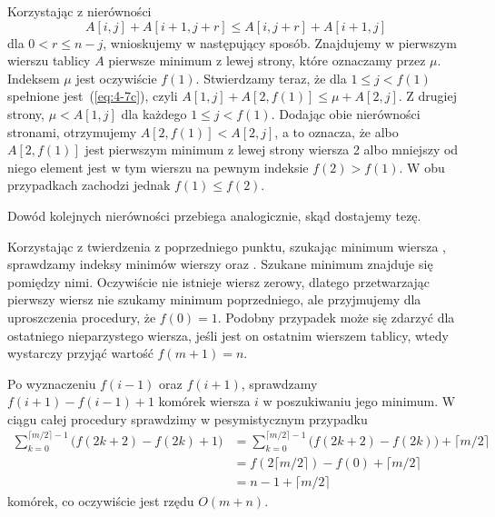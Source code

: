 \subexercise{} %
Korzystając z nierówności
\begin{equation}
	A[i,j]+A[i+1,j+r] \le A[i,j+r]+A[i+1,j] \label{eq:4-7c}
\end{equation}
dla $0<r\le n-j$, wnioskujemy w następujący sposób. Znajdujemy w pierwszym wierszu tablicy $A$ pierwsze minimum z lewej strony, które oznaczamy przez $\mu$. Indeksem $\mu$ jest oczywiście $f(1)$. Stwierdzamy teraz, że dla $1\le j<f(1)$ spełnione jest~(\ref{eq:4-7c}), czyli $A[1,j]+A[2,f(1)]\le\mu+A[2,j]$. Z drugiej strony, $\mu<A[1,j]$ dla każdego $1\le j<f(1)$. Dodając obie nierówności stronami, otrzymujemy $A[2,f(1)]<A[2,j]$, a to oznacza, że albo $A[2,f(1)]$ jest pierwszym minimum z lewej strony wiersza 2 albo mniejszy od niego element jest w tym wierszu na pewnym indeksie $f(2)>f(1)$. W obu przypadkach zachodzi jednak $f(1)\le f(2)$.

Dowód kolejnych nierówności przebiega analogicznie, skąd dostajemy tezę.

\subexercise{} %
Korzystając z twierdzenia z poprzedniego punktu, szukając minimum wiersza , sprawdzamy indeksy minimów wierszy  oraz . Szukane minimum znajduje się pomiędzy nimi. Oczywiście nie istnieje wiersz zerowy, dlatego przetwarzając pierwszy wiersz nie szukamy minimum poprzedniego, ale przyjmujemy dla uproszczenia procedury, że $f(0)=1$. Podobny przypadek może się zdarzyć dla ostatniego nieparzystego wiersza, jeśli jest on ostatnim wierszem tablicy, wtedy wystarczy przyjąć wartość $f(m+1)=n$.

Po wyznaczeniu $f(i-1)$ oraz $f(i+1)$, sprawdzamy $f(i+1)-f(i-1)+1$ komórek wiersza $i$ w poszukiwaniu jego minimum. W ciągu całej procedury sprawdzimy w pesymistycznym przypadku
\begin{align*}
	\sum_{k=0}^{\lceil m/2\rceil-1}\bigl(f(2k+2)-f(2k)+1\bigr) &= \sum_{k=0}^{\lceil m/2\rceil-1}\bigl(f(2k+2)-f(2k))+\lceil m/2\rceil \\
	&= f(2\lceil m/2\rceil)-f(0)+\lceil m/2\rceil \\[2mm]
	&= n-1+\lceil m/2\rceil
\end{align*}
komórek, co oczywiście jest rzędu $O(m+n)$.

